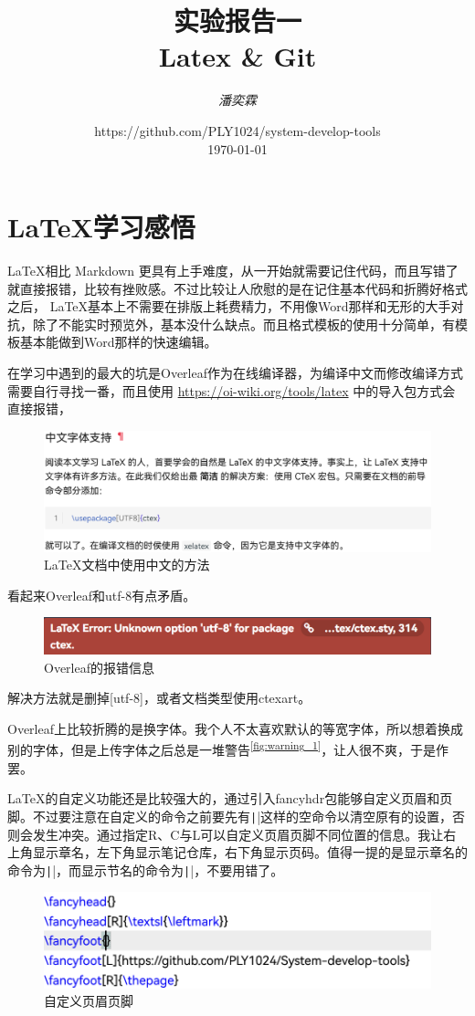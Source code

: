 \documentclass[fontset=ubuntu]{ctexart}
\title{\Huge \textbf{实验报告一\\ Latex{} \& Git}}
\author{\textit{潘奕霖}}
\date{https://github.com/PLY1024/system-develop-tools\\ \today}
\begin{document}
\maketitle
\newpage

\tableofcontents
\newpage

\section{ \LaTeX 学习感悟}
\LaTeX 相比 Markdown 更具有上手难度，从一开始就需要记住代码，而且写错了就直接报错，比较有挫败感。不过比较让人欣慰的是在记住基本代码和折腾好格式之后， \LaTeX 基本上不需要在排版上耗费精力，不用像Word那样和无形的大手对抗，除了不能实时预览外，基本没什么缺点。而且格式模板的使用十分简单，有模板基本能做到Word那样的快速编辑。

在学习中遇到的最大的坑是Overleaf作为在线编译器，为编译中文而修改编译方式需要自行寻找一番，而且使用 \url{https://oi-wiki.org/tools/latex} 中的导入包方式会直接报错，
\begin{figure}[hbt]
    \centering
    \includegraphics[width=0.5\linewidth]{chinese_1.png}
    \caption{ \LaTeX 文档中使用中文的方法}
    \label{fig:chinese_1}
\end{figure}
看起来Overleaf和utf-8有点矛盾。
\begin{figure}[hbt]
    \centering
    \includegraphics[width=0.5\linewidth]{error_1.png}
    \caption{Overleaf的报错信息}
    \label{fig:error_1}
\end{figure}

解决方法就是删掉[utf-8]，或者文档类型使用ctexart。

Overleaf上比较折腾的是换字体。我个人不太喜欢默认的等宽字体，所以想着换成别的字体，但是上传字体之后总是一堆警告\textsuperscript{\ref{fig:warning_1}}，让人很不爽，于是作罢。

\LaTeX 的自定义功能还是比较强大的，通过引入fancyhdr包能够自定义页眉和页脚。不过要注意在自定义的命令之前要先有\texttt|\fancyhead{}|这样的空命令以清空原有的设置，否则会发生冲突。通过指定R、C与L可以自定义页眉页脚不同位置的信息。我让右上角显示章名，左下角显示笔记仓库，右下角显示页码。值得一提的是显示章名的命令为\texttt|\leftmark|，而显示节名的命令为\texttt|\rightmark|，不要用错了。
\begin{figure}[htb]
    \centering
    \includegraphics[width=0.75\linewidth]{custom_1.png}
    \caption{自定义页眉页脚}
    \label{fig:custom_1}
\end{figure}
\end{document}
